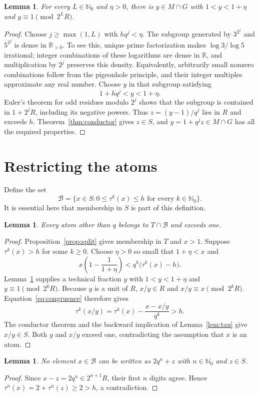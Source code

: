 \documentclass[11pt]{article}
\newtheorem{lemma}[theorem]{Lemma}
\theoremstyle{definition}
\newcommand{\NN}{\mathbb N}
\begin{document}
\begin{lemma}\label{lem:small}
For every $L\in\NN_0$ and $\eta>0$, there is $y\in M\cap G$ with
$1<y<1+\eta$ and $y\equiv1\pmod{2^LR}$.
\end{lemma}
\begin{proof}
Choose $j\ge\max(1,L)$ with $hq^j<\eta$.
The subgroup generated by $3^{2^j}$ and $5^{2^j}$ is dense in
$\mathbb R_{>0}$. To see this, unique prime factorization makes
$\log3/\log5$ irrational; integer combinations of these logarithms
are dense in $\mathbb R$, and multiplication by $2^j$ preserves
this density. Equivalently, arbitrarily small nonzero combinations
follow from the pigeonhole principle, and their integer multiples
approximate any real number.
Choose $y$ in that subgroup satisfying
\[
 1+hq^j<y<1+\eta.
\]
Euler's theorem for odd residues modulo $2^j$ shows that the subgroup
is contained in $1+2^jR$, including its negative powers.
Thus $z=(y-1)/q^j$ lies in $R$ and exceeds $h$.
Theorem~\ref{thm:conductor} gives $z\in S$, and
$y=1+q^jz\in M\cap G$ has all the required properties.
\end{proof}

\section{Restricting the atoms}
Define the set
\[
 \mathcal B=\{x\in S:0\le\tau^k(x)\le h\text{ for every }k\in\NN_0\}.
\]
It is essential here that membership in $S$ is part of this definition.

\begin{lemma}\label{lem:atomsboundary}
Every atom other than $q$ belongs to $T\cap\mathcal B$ and exceeds one.
\end{lemma}
\begin{proof}
Proposition~\ref{prop:split} gives membership in $T$ and $x>1$.
Suppose $\tau^k(x)>h$ for some $k\ge0$.
Choose $\eta>0$ so small that $1+\eta<x$ and
\[
 x\left(1-\frac1{1+\eta}\right)
 <q^k\bigl(\tau^k(x)-h\bigr).
\]
Lemma~\ref{lem:small} supplies a technical fraction $y$ with
$1<y<1+\eta$ and $y\equiv1\pmod{2^kR}$.
Because $y$ is a unit of $R$, $x/y\in R$ and $x/y\equiv x\pmod{2^kR}$.
Equation~\eqref{eq:congruence} therefore gives
\[
 \tau^k(x/y)=\tau^k(x)-\frac{x-x/y}{q^k}>h.
\]
The conductor theorem and the backward implication of
Lemma~\ref{lem:tau} give $x/y\in S$.
Both $y$ and $x/y$ exceed one, contradicting the assumption that $x$
is an atom.
\end{proof}

\begin{lemma}\label{lem:nooverlap}
No element $x\in\mathcal B$ can be written as $2q^n+z$ with
$n\in\NN_0$ and $z\in S$.
\end{lemma}
\begin{proof}
Since $x-z=2q^n\in2^{n+1}R$, their first $n$ digits agree. Hence
$\tau^n(x)=2+\tau^n(z)\ge2>h$, a contradiction.
\end{proof}
\end{document}
